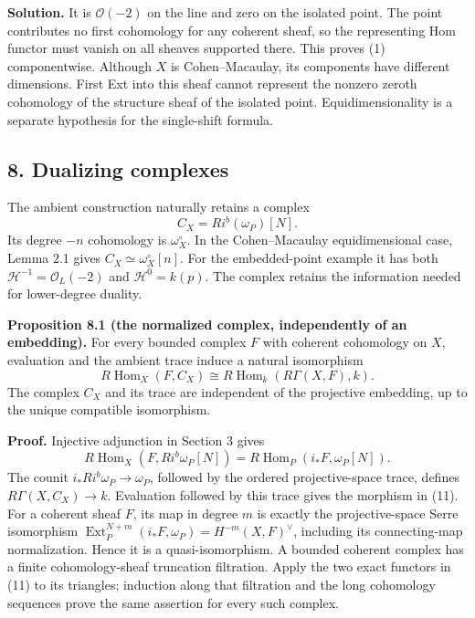 \documentclass[11pt]{article}
\begin{document}
\textbf{Solution.} It is \(\mathcal O(-2)\) on the line and zero on the
isolated point. The point contributes no first cohomology for any
coherent sheaf, so the representing Hom functor must vanish on all
sheaves supported there. This proves (1) componentwise. Although \(X\)
is Cohen--Macaulay, its components have different dimensions. First Ext
into this sheaf cannot represent the nonzero zeroth cohomology of the
structure sheaf of the isolated point. Equidimensionality is a separate
hypothesis for the single-shift formula.

\subsection{8. Dualizing complexes}\label{dualizing-complexes}

The ambient construction naturally retains a complex \[
C_X=R i^b(\omega_P)[N].
\] Its degree \(-n\) cohomology is \(\omega_X^\circ\). In the
Cohen--Macaulay equidimensional case, Lemma 2.1 gives
\(C_X\simeq\omega_X^\circ[n]\). For the embedded-point example it has
both \(\mathcal H^{-1}=\mathcal O_L(-2)\) and \(\mathcal H^0=k(p)\). The
complex retains the information needed for lower-degree duality.

\textbf{Proposition 8.1 (the normalized complex, independently of an
embedding).} For every bounded complex \(F\) with coherent cohomology on
\(X\), evaluation and the ambient trace induce a natural isomorphism \[
R\operatorname{Hom}_X(F,C_X)
\cong R\operatorname{Hom}_k(R\Gamma(X,F),k).
\tag{11}
\] The complex \(C_X\) and its trace are independent of the projective
embedding, up to the unique compatible isomorphism.

\textbf{Proof.} Injective adjunction in Section 3 gives \[
R\operatorname{Hom}_X(F,Ri^b\omega_P[N])
=R\operatorname{Hom}_P(i_*F,\omega_P[N]).
\] The counit \(i_*Ri^b\omega_P\to\omega_P\), followed by the ordered
projective-space trace, defines \(R\Gamma(X,C_X)\to k\). Evaluation
followed by this trace gives the morphism in (11). For a coherent sheaf
\(F\), its map in degree \(m\) is exactly the projective-space Serre
isomorphism
\(\operatorname{Ext}^{N+m}_P(i_*F,\omega_P)=H^{-m}(X,F)^\vee\),
including its connecting-map normalization. Hence it is a
quasi-isomorphism. A bounded coherent complex has a finite
cohomology-sheaf truncation filtration. Apply the two exact functors in
(11) to its triangles; induction along that filtration and the long
cohomology sequences prove the same assertion for every such complex.
\end{document}
